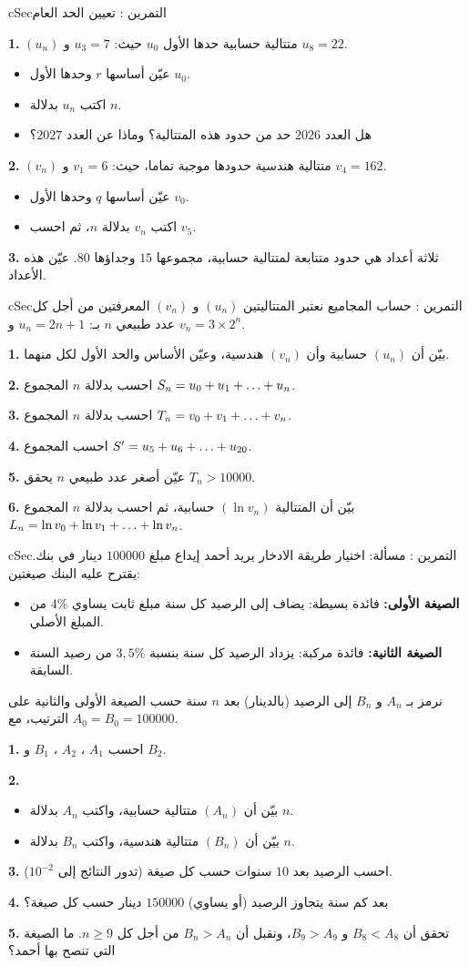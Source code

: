 \documentclass[12pt,a4paper]{article}
\newenvironment{BOX}[2]{\begin{otherlanguage}{english}\begin{arbox}{#1}{#2}}{\end{arbox}\end{otherlanguage}}
\newcounter{exo}
\newenvironment{tamrin}[1]{\stepcounter{exo}\begin{BOX}{cSec}{التمرين \theexo: #1}}{\end{BOX}}
\renewcommand{\dots}{\mathinner{\ldotp\ldotp\ldotp}}
\newenvironment{sq}{\begin{itemize}[leftmargin=2.4em,itemsep=3pt]}{\end{itemize}}
\newcommand{\qa}{\item[(أ)]}\newcommand{\qb}{\item[(ب)]}\newcommand{\qc}{\item[(جـ)]}\newcommand{\qd}{\item[(د)]}\newcommand{\qe}{\item[(هـ)]}
\newcommand{\QQ}[1]{\par\smallskip\textbf{#1.} }
\begin{document}
\begin{tamrin}{تعيين الحد العام}
\QQ{1} $(u_n)$ متتالية حسابية حدها الأول $u_0$ حيث: $u_3=7$ و $u_8=22$.
\begin{sq}
\qa عيّن أساسها $r$ وحدها الأول $u_0$.
\qb اكتب $u_n$ بدلالة $n$.
\qc هل العدد $2026$ حد من حدود هذه المتتالية؟ وماذا عن العدد $2027$؟
\end{sq}
\QQ{2} $(v_n)$ متتالية هندسية حدودها موجبة تماما، حيث: $v_1=6$ و $v_4=162$.
\begin{sq}
\qa عيّن أساسها $q$ وحدها الأول $v_0$.
\qb اكتب $v_n$ بدلالة $n$، ثم احسب $v_5$.
\end{sq}
\QQ{3} ثلاثة أعداد هي حدود متتابعة لمتتالية حسابية، مجموعها $15$ وجداؤها $80$. عيّن هذه الأعداد.
\end{tamrin}

\begin{tamrin}{حساب المجاميع}
نعتبر المتتاليتين $(u_n)$ و $(v_n)$ المعرفتين من أجل كل عدد طبيعي $n$ بـ: $u_n=2n+1$ و $v_n=3\times 2^{n}$.
\QQ{1} بيّن أن $(u_n)$ حسابية وأن $(v_n)$ هندسية، وعيّن الأساس والحد الأول لكل منهما.
\QQ{2} احسب بدلالة $n$ المجموع $S_n=u_0+u_1+\dots+u_n$.
\QQ{3} احسب بدلالة $n$ المجموع $T_n=v_0+v_1+\dots+v_n$.
\QQ{4} احسب المجموع $S'=u_5+u_6+\dots+u_{20}$.
\QQ{5} عيّن أصغر عدد طبيعي $n$ يحقق $T_n>10000$.
\QQ{6} بيّن أن المتتالية $\left(\ln v_n\right)$ حسابية، ثم احسب بدلالة $n$ المجموع $L_n=\ln v_0+\ln v_1+\dots+\ln v_n$.
\end{tamrin}

\begin{tamrin}{مسألة: اختيار طريقة الادخار}
يريد أحمد إيداع مبلغ $100000$ دينار في بنك. يقترح عليه البنك صيغتين:
\begin{itemize}
\item \textbf{الصيغة الأولى:} فائدة بسيطة: يضاف إلى الرصيد كل سنة مبلغ ثابت يساوي $4\%$ من المبلغ الأصلي.
\item \textbf{الصيغة الثانية:} فائدة مركبة: يزداد الرصيد كل سنة بنسبة $3{,}5\%$ من رصيد السنة السابقة.
\end{itemize}
نرمز بـ $A_n$ و $B_n$ إلى الرصيد (بالدينار) بعد $n$ سنة حسب الصيغة الأولى والثانية على الترتيب، مع $A_0=B_0=100000$.
\QQ{1} احسب $A_1$ ، $A_2$ ، $B_1$ و $B_2$.
\QQ{2}
\begin{sq}
\qa بيّن أن $(A_n)$ متتالية حسابية، واكتب $A_n$ بدلالة $n$.
\qb بيّن أن $(B_n)$ متتالية هندسية، واكتب $B_n$ بدلالة $n$.
\end{sq}
\QQ{3} احسب الرصيد بعد $10$ سنوات حسب كل صيغة (تدور النتائج إلى $10^{-2}$).
\QQ{4} بعد كم سنة يتجاوز الرصيد (أو يساوي) $150000$ دينار حسب كل صيغة؟
\QQ{5} تحقق أن $B_8<A_8$ و $B_9>A_9$، ونقبل أن $B_n>A_n$ من أجل كل $n\geqslant 9$. ما الصيغة التي تنصح بها أحمد؟
\end{tamrin}
\end{document}
